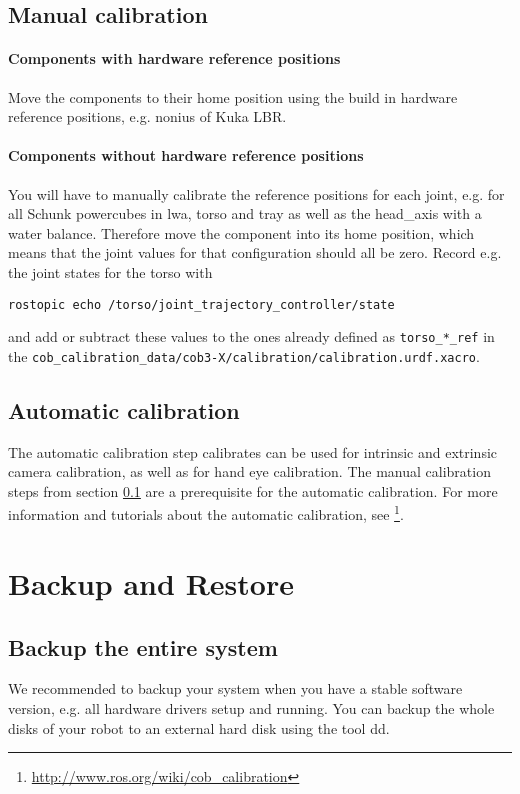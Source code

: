\subsection{Manual calibration}\label{sec:manual_calibration}

\paragraph{Components with hardware reference positions}
Move the components to their home position using the build in hardware reference positions, e.g. nonius of Kuka LBR.

\paragraph{Components without hardware reference positions}
You will have to manually calibrate the reference positions for each joint, e.g. for all Schunk powercubes in lwa, torso and tray as well as the head\_axis with a water balance. Therefore move the component into its home position, which means that the joint values for that configuration should all be zero. Record e.g. the joint states for the torso with
\begin{lstlisting}
rostopic echo /torso/joint_trajectory_controller/state
\end{lstlisting}
and add or subtract these values to the ones already defined as \texttt{torso\_*\_ref} in the \texttt{cob\_calibration\_data/cob3-X/calibration/calibration.urdf.xacro}.

\subsection{Automatic calibration}
The automatic calibration step calibrates can be used for intrinsic and extrinsic camera calibration, as well as for hand eye calibration. The manual calibration steps from section \ref{sec:manual_calibration} are a prerequisite for the automatic calibration. For more information and tutorials about the automatic calibration, see \footnote{\url{http://www.ros.org/wiki/cob_calibration}}.

\section{Backup and Restore} 
\subsection{Backup the entire system}  
We recommended to backup your system when you have a stable software version, e.g. all hardware drivers setup and running. You can backup the whole disks of your robot to an external hard disk using the tool dd.

